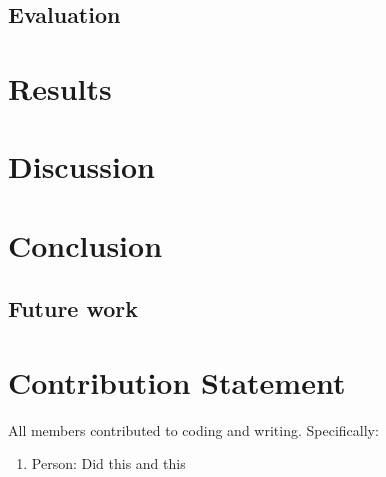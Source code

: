 \documentclass{article}
\begin{document}
\subsection{Evaluation}

\section{Results}

\section{Discussion}

\section{Conclusion}

\subsection{Future work}

\section*{Contribution Statement}
All members contributed to coding and writing. Specifically:
\begin{enumerate}
\item Person: Did this and this
\end{enumerate}



\end{document}
